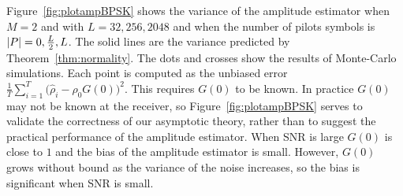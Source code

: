 \documentclass[draftcls, onecolumn, 11pt]{IEEEtran}
\begin{document}
Figure~\ref{fig:plotampBPSK} %
shows the variance of the amplitude estimator when $M=2$ and with $L=32, 256, 2048$ and when the number of pilots symbols is ${\left\vert P \right\vert} = 0, \tfrac{L}{2}, L$.  The solid lines are the variance predicted by Theorem~\ref{thm:normality}.  The dots and crosses show the results of Monte-Carlo simulations.  Each point is computed as the unbiased error $\tfrac{1}{T}\sum_{i=1}^T\big(\hat{\rho}_i - \rho_0G(0)\big)^2$.  This requires $G(0)$ to be known.  In practice $G(0)$ may not be known at the receiver, so Figure~\ref{fig:plotampBPSK} %
serves to validate the correctness of our asymptotic theory, rather than to suggest the practical performance of the amplitude estimator.  When SNR is large $G(0)$ is close to $1$ and the bias of the amplitude estimator is small.  However, $G(0)$ grows without bound as the variance of the noise increases, so the bias is significant when SNR is small.  %
\end{document}
